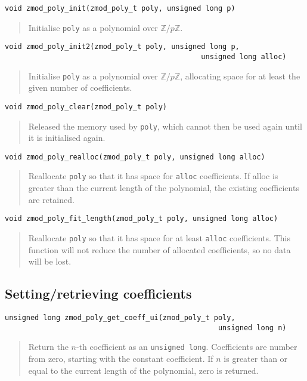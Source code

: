 \documentclass[a4paper,10pt]{article}
\newcommand{\Z}{\mathbb{Z}}
\newcommand{\code}{\lstinline}
\begin{document}
\begin{lstlisting}
void zmod_poly_init(zmod_poly_t poly, unsigned long p)
\end{lstlisting}
\begin{quote}
Initialise \code{poly} as a polynomial over $\Z/p\Z$. 
\end{quote}

\begin{lstlisting}
void zmod_poly_init2(zmod_poly_t poly, unsigned long p, 
                                              unsigned long alloc)
\end{lstlisting}
\begin{quote}
Initialise \code{poly} as a polynomial over $\Z/p\Z$, allocating space for at least the given number of coefficients. 
\end{quote}

\begin{lstlisting}
void zmod_poly_clear(zmod_poly_t poly)
\end{lstlisting}
\begin{quote}
Released the memory used by \code{poly}, which cannot then be used again until it is initialised again.
\end{quote}

\begin{lstlisting}
void zmod_poly_realloc(zmod_poly_t poly, unsigned long alloc)
\end{lstlisting}
\begin{quote}
Reallocate \code{poly} so that it has space for \code{alloc} coefficients. If alloc is greater than the current length of the polynomial, the existing coefficients are retained.
\end{quote}

\begin{lstlisting}
void zmod_poly_fit_length(zmod_poly_t poly, unsigned long alloc)
\end{lstlisting}
\begin{quote}
Reallocate \code{poly} so that it has space for at least \code{alloc} coefficients. This function will not reduce the number of allocated coefficients, so no data will be lost.
\end{quote}

\subsection{Setting/retrieving coefficients}

\begin{lstlisting}
unsigned long zmod_poly_get_coeff_ui(zmod_poly_t poly, 
                                                  unsigned long n)
\end{lstlisting}
\begin{quote}
Return the $n$-th coefficient as an \code{unsigned long}. Coefficients are number from zero, starting with the constant coefficient. If $n$ is greater than or equal to the current length of the polynomial, zero is returned.
\end{quote}
\end{document}
